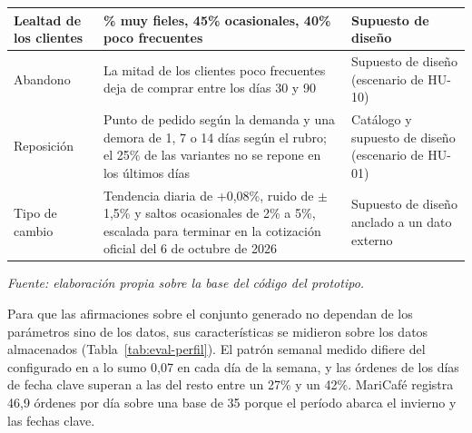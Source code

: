 \begin{table}[!htbp]
\begin{tabular}{|>{\raggedright\arraybackslash}m{3.4cm}|>{\raggedright\arraybackslash}m{5.2cm}|>{\raggedright\arraybackslash}m{4.2cm}|}
\hline
Lealtad de los clientes & 15\% muy fieles, 45\% ocasionales, 40\% poco frecuentes & Supuesto de diseño \\
\hline
Abandono & La mitad de los clientes poco frecuentes deja de comprar entre los días 30 y 90 & Supuesto de diseño (escenario de HU-10) \\
\hline
Reposición & Punto de pedido según la demanda y una demora de 1, 7 o 14 días según el rubro; el 25\% de las variantes no se repone en los últimos días & Catálogo y supuesto de diseño (escenario de HU-01) \\
\hline
Tipo de cambio & Tendencia diaria de +0,08\%, ruido de $\pm$1,5\% y saltos ocasionales de 2\% a 5\%, escalada para terminar en la cotización oficial del 6 de octubre de 2026 & Supuesto de diseño anclado a un dato externo \\
\hline
\end{tabular}

\smallskip
\noindent\textit{Fuente: elaboración propia sobre la base del código del prototipo.}
\end{table}

Para que las afirmaciones sobre el conjunto generado no dependan de los parámetros sino de los datos, sus características se midieron sobre los datos almacenados (Tabla~\ref{tab:eval-perfil}). El patrón semanal medido difiere del configurado en a lo sumo 0,07 en cada día de la semana, y las órdenes de los días de fecha clave superan a las del resto entre un 27\% y un 42\%. MariCafé registra 46,9 órdenes por día sobre una base de 35 porque el período abarca el invierno y las fechas clave.

